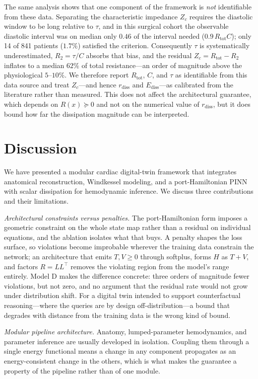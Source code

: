 \documentclass[journal]{IEEEtran}
\begin{document}
The same analysis shows that one component of the framework is \emph{not} identifiable from these data. Separating the characteristic impedance $Z_c$ requires the diastolic window to be long relative to $\tau$, and in this surgical cohort the observable diastolic interval was on median only $0.46$ of the interval needed ($0.9\,R_{\text{tot}}C$); only 14 of 841 patients ($1.7\%$) satisfied the criterion. Consequently $\tau$ is systematically underestimated, $R_2=\tau/C$ absorbs that bias, and the residual $Z_c=R_{\text{tot}}-R_2$ inflates to a median $62\%$ of total resistance---an order of magnitude above the physiological $5$--$10\%$. We therefore report $R_{\text{tot}}$, $C$, and $\tau$ as identifiable from this data source and treat $Z_c$---and hence $r_{\text{diss}}$ and $E_{\text{diss}}$---as calibrated from the literature rather than measured. This does not affect the architectural guarantee, which depends on $R(x)\succeq0$ and not on the numerical value of $r_{\text{diss}}$, but it does bound how far the dissipation magnitude can be interpreted.


\section{Discussion}\label{sec:discussion}
We have presented a modular cardiac digital-twin framework that integrates anatomical reconstruction, Windkessel modeling, and a port-Hamiltonian PINN with scalar dissipation for hemodynamic inference. We discuss three contributions and their limitations.

\emph{Architectural constraints versus penalties.} The port-Hamiltonian form imposes a geometric constraint on the whole state map rather than a residual on individual equations, and the ablation isolates what that buys. A penalty shapes the loss surface, so violations become improbable wherever the training data constrain the network; an architecture that emits $T,V\ge0$ through softplus, forms $H$ as $T+V$, and factors $R=LL^{\top}$ removes the violating region from the model's range entirely. Model D makes the difference concrete: three orders of magnitude fewer violations, but not zero, and no argument that the residual rate would not grow under distribution shift. For a digital twin intended to support counterfactual reasoning---where the queries are by design off-distribution---a bound that degrades with distance from the training data is the wrong kind of bound.

\emph{Modular pipeline architecture.} Anatomy, lumped-parameter hemodynamics, and parameter inference are usually developed in isolation. Coupling them through a single energy functional means a change in any component propagates as an energy-consistent change in the others, which is what makes the guarantee a property of the pipeline rather than of one module.
\end{document}
